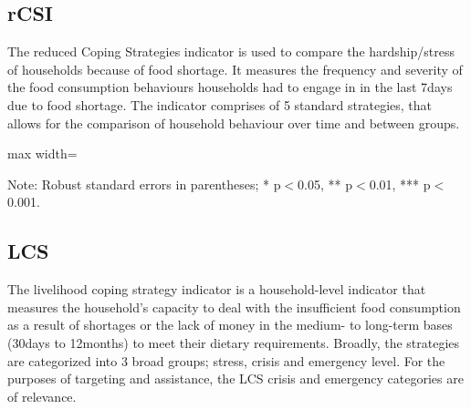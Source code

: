 \documentclass[11pt,harvard]{article}
\begin{document}
	\pagebreak	
	
	
	

	\subsection{rCSI}
	
	The reduced Coping Strategies indicator is used to compare the hardship/stress of households because of food shortage. It measures the frequency and severity of the food consumption behaviours households had to engage in in the last 7days due to food shortage. The indicator comprises of 5 standard strategies, that allows for the comparison of household behaviour over time and between groups.
	
	
	\begin{table}[htbp]
		\centering
		\begin{adjustbox}{max width=\textwidth}
			\begin{threeparttable}
				\caption{Impact of Survey Modality on Reduced Coping Strategy Index Classification}
				\scriptsize
				 
				\label{tab:rCSI_Modality_CAR}
				\begin{tablenotes}
					\item Note: Robust standard errors in parentheses; * p$<$0.05, ** p$<$0.01, *** p$<$0.001. 
				\end{tablenotes}
			\end{threeparttable}
		\end{adjustbox}
	\end{table}


	\pagebreak
	
	
	\subsection{LCS}

	The livelihood coping strategy indicator is a household-level indicator that measures the household's capacity to deal with the insufficient food consumption as a result of shortages or the lack of money in the medium- to long-term bases (30days to 12months) to meet their dietary requirements. Broadly, the strategies are categorized into 3 broad groups; stress, crisis and emergency level. For the purposes of targeting and assistance, the LCS crisis and emergency categories are of relevance.
	
\end{document}
